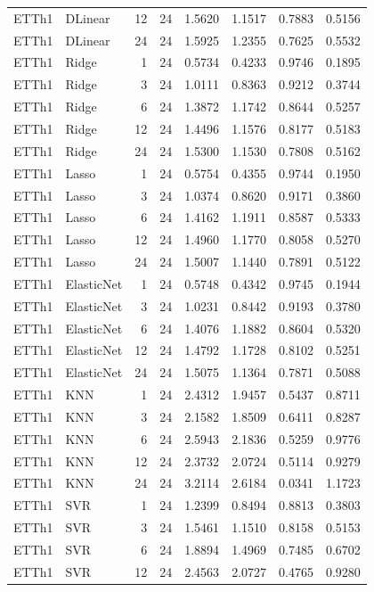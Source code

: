 \begin{tabular}{llrrrrrr}
ETTh1 & DLinear & 12 & 24 & 1.5620 & 1.1517 & 0.7883 & 0.5156 \\
ETTh1 & DLinear & 24 & 24 & 1.5925 & 1.2355 & 0.7625 & 0.5532 \\
ETTh1 & Ridge & 1 & 24 & 0.5734 & 0.4233 & 0.9746 & 0.1895 \\
ETTh1 & Ridge & 3 & 24 & 1.0111 & 0.8363 & 0.9212 & 0.3744 \\
ETTh1 & Ridge & 6 & 24 & 1.3872 & 1.1742 & 0.8644 & 0.5257 \\
ETTh1 & Ridge & 12 & 24 & 1.4496 & 1.1576 & 0.8177 & 0.5183 \\
ETTh1 & Ridge & 24 & 24 & 1.5300 & 1.1530 & 0.7808 & 0.5162 \\
ETTh1 & Lasso & 1 & 24 & 0.5754 & 0.4355 & 0.9744 & 0.1950 \\
ETTh1 & Lasso & 3 & 24 & 1.0374 & 0.8620 & 0.9171 & 0.3860 \\
ETTh1 & Lasso & 6 & 24 & 1.4162 & 1.1911 & 0.8587 & 0.5333 \\
ETTh1 & Lasso & 12 & 24 & 1.4960 & 1.1770 & 0.8058 & 0.5270 \\
ETTh1 & Lasso & 24 & 24 & 1.5007 & 1.1440 & 0.7891 & 0.5122 \\
ETTh1 & ElasticNet & 1 & 24 & 0.5748 & 0.4342 & 0.9745 & 0.1944 \\
ETTh1 & ElasticNet & 3 & 24 & 1.0231 & 0.8442 & 0.9193 & 0.3780 \\
ETTh1 & ElasticNet & 6 & 24 & 1.4076 & 1.1882 & 0.8604 & 0.5320 \\
ETTh1 & ElasticNet & 12 & 24 & 1.4792 & 1.1728 & 0.8102 & 0.5251 \\
ETTh1 & ElasticNet & 24 & 24 & 1.5075 & 1.1364 & 0.7871 & 0.5088 \\
ETTh1 & KNN & 1 & 24 & 2.4312 & 1.9457 & 0.5437 & 0.8711 \\
ETTh1 & KNN & 3 & 24 & 2.1582 & 1.8509 & 0.6411 & 0.8287 \\
ETTh1 & KNN & 6 & 24 & 2.5943 & 2.1836 & 0.5259 & 0.9776 \\
ETTh1 & KNN & 12 & 24 & 2.3732 & 2.0724 & 0.5114 & 0.9279 \\
ETTh1 & KNN & 24 & 24 & 3.2114 & 2.6184 & 0.0341 & 1.1723 \\
ETTh1 & SVR & 1 & 24 & 1.2399 & 0.8494 & 0.8813 & 0.3803 \\
ETTh1 & SVR & 3 & 24 & 1.5461 & 1.1510 & 0.8158 & 0.5153 \\
ETTh1 & SVR & 6 & 24 & 1.8894 & 1.4969 & 0.7485 & 0.6702 \\
ETTh1 & SVR & 12 & 24 & 2.4563 & 2.0727 & 0.4765 & 0.9280 \\

\end{tabular}
